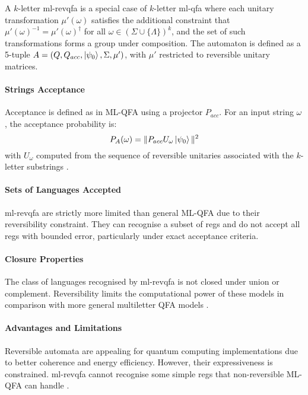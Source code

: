 \begin{definition}
A $k$-letter \gls{ml-revqfa} is a special case of $k$-letter \gls{ml-qfa} where each unitary transformation $\mu'(\omega)$ satisfies the additional constraint that $\mu'(\omega)^{-1} = \mu'(\omega)^\dagger$ for all $\omega \in (\Sigma \cup \{\Lambda\})^k$, and the set of such transformations forms a group under composition.
The automaton is defined as a 5-tuple $A = (Q, Q_{acc}, \ket{\psi_0}, \Sigma, \mu')$, with $\mu'$ restricted to reversible unitary matrices.
\end{definition}

\paragraph{Strings Acceptance}
Acceptance is defined as in ML-QFA using a projector $P_{acc}$. For an input string $\omega$, the acceptance probability is:
\[
P_A(\omega) = \| P_{acc} U_{\omega} \ket{\psi_0} \|^2
\]
with $U_{\omega}$ computed from the sequence of reversible unitaries associated with the $k$-letter substrings \cite{belovs2007multi}.

\paragraph{Sets of Languages Accepted}
\gls{ml-revqfa} are strictly more limited than general ML-QFA due to their reversibility constraint. They can recognise a subset of \glspl{reg} and do not accept all \glspl{reg} with bounded error, particularly under exact acceptance criteria.

\paragraph{Closure Properties}
The class of languages recognised by \gls{ml-revqfa} is not closed under union or complement. Reversibility limits the computational power of these models in comparison with more general multiletter QFA models \cite{belovs2007multi}.

\paragraph{Advantages and Limitations}
Reversible automata are appealing for quantum computing implementations due to better coherence and energy efficiency. However, their expressiveness is constrained. \gls{ml-revqfa} cannot recognise some simple \glspl{reg} that non-reversible ML-QFA can handle \cite{belovs2007multi}.

